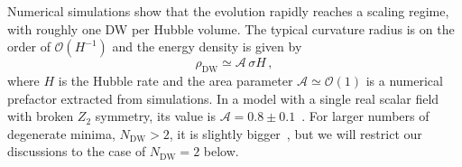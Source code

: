 \documentclass{article}
\begin{document}
Numerical simulations show that the evolution rapidly reaches a scaling regime, with roughly one DW per Hubble volume.
The  typical curvature radius is on the order of $\mathcal{O}(H^{-1})$ and the energy density is given by
\begin{equation}
    \rho_\mathrm{DW} \simeq \mathcal{A} \, \sigma H\,,
\end{equation}
where $H$ is the Hubble rate and the area parameter $\mathcal{A} \simeq \mathcal{O}(1)$ is a numerical prefactor extracted from simulations. In a model with a single real scalar field with broken $Z_2$ symmetry, its value is $\mathcal{A}= 0.8\pm 0.1$~\cite{Hiramatsu:2013qaa}.  For larger numbers of degenerate minima, $N_\mathrm{DW}>2$, it is slightly bigger~\cite{Kawasaki:2014sqa}, but we will restrict our discussions to the case of $N_\mathrm{DW}=2$ below. 
\end{document}
